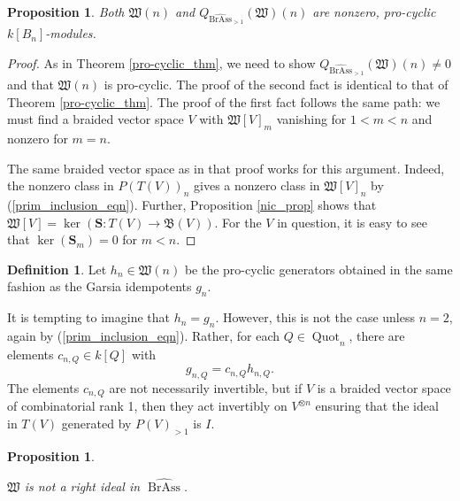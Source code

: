 \documentclass[12pt]{article}
\DeclareMathOperator{\Quot}{Quot}
\DeclareMathOperator{\BrAss}{BrAss}
\newcommand{\BrAsshat}{\widehat{\BrAss}} %
\newcommand{\bS} {\mathbf{S}}
\newcommand{\mB}{\mathfrak{B}}
\newcommand{\mW}{\mathfrak{W}}
\theoremstyle{plain}
\newtheorem{prop}[thm]{Proposition}
\theoremstyle{definition}
\newtheorem{defn}[thm]{Definition}
\theoremstyle{remark}
\begin{document}
\begin{prop}

Both $\mW(n)$ and $Q_{\BrAsshat_{>1}}(\mW)(n)$ are nonzero, pro-cyclic $k[B_n]$-modules.

\end{prop}

\begin{proof}

As in Theorem \ref{pro-cyclic_thm}, we need to show $Q_{\BrAsshat_{>1}}(\mW)(n) \neq 0$ and that $\mW(n)$ is pro-cyclic.  The proof of the second fact is identical to that of Theorem \ref{pro-cyclic_thm}.  The proof of the first fact follows the same path: we must find a braided vector space $V$ with $\mW[V]_m$ vanishing for $1<m<n$ and nonzero for $m=n$.  

The same braided vector space as in that proof works for this argument.  Indeed, the nonzero class in $P(T(V))_n$ gives a nonzero class in $\mW[V]_n$ by (\ref{prim_inclusion_eqn}).  Further, Proposition \ref{nic_prop} shows that $\mW[V] = \ker(\bS: T(V) \to \mB(V))$.  For the $V$ in question, it is easy to see that $\ker(\bS_m) = 0$ for $m<n$.

\end{proof}

\begin{defn} \label{h_n_defn} Let $h_n \in \mW(n)$ be the pro-cyclic generators obtained in the same fashion as the Garsia idempotents $g_n$. \end{defn}

It is tempting to imagine that $h_n = g_n$.  However, this is not the case unless $n=2$, again by (\ref{prim_inclusion_eqn}).  Rather, for each $Q \in \Quot_n$, there are elements $c_{n,Q} \in k[Q]$ with 
%
$$g_{n, Q} = c_{n, Q} h_{n, Q}.$$
%
The elements $c_{n, Q}$ are not necessarily invertible, but if $V$ is a braided vector space of combinatorial rank 1, then they act invertibly on $V^{\otimes n}$ ensuring that the ideal in $T(V)$ generated by $P(V)_{>1}$ is $I$.

\begin{prop} \label{not_ideal_prop}

$\mW$ is not a right ideal in $\BrAsshat$.

\end{prop}
\end{document}
